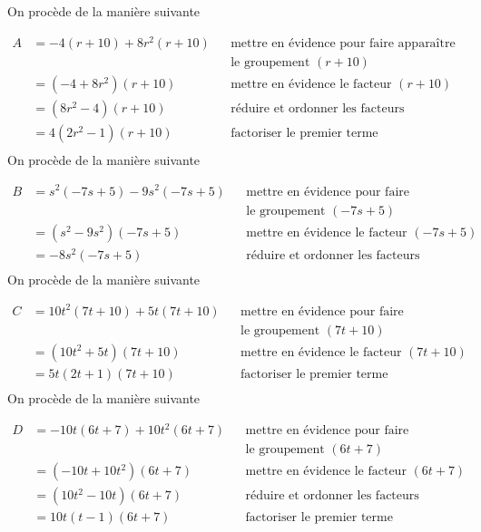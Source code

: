\documentclass[a4paper,12pt]{report}
\begin{document}
\begin{core}\phantom{ }

\begin{tasks}
\task On procède de la manière suivante 

\medskip
 $\begin{aligned}A&=-4 (r + 10 )+8 r^2(r + 10 )&&\text{mettre en évidence pour faire apparaître}\\
        & &&\text{le groupement }(r + 10 )\\&=(-4  + 8 r^2)(r + 10 )&& \text{mettre en évidence le facteur } (r + 10 )\\&=(8 r^2-4 )(r + 10 ) && \text{réduire et ordonner les facteurs}\\&={{4 (2 r^2-1)(r + 10 )}}&& \text{factoriser le premier terme}\\\end{aligned}$
\task On procède de la manière suivante 

\medskip
 $\begin{aligned}B&=s^2(-7 s + 5 )-9 s^2(-7 s + 5 )&&\text{mettre en évidence pour faire apparaître}\\
        & &&\text{le groupement }(-7 s + 5 )\\&=(s^2-9 s^2)(-7 s + 5 )&& \text{mettre en évidence le facteur } (-7 s + 5 )\\&={{-8 s^2(-7 s + 5 )}}&& \text{réduire et ordonner les facteurs}\\\end{aligned}$
\task On procède de la manière suivante 

\medskip
 $\begin{aligned}C&=10 t^2(7 t + 10 )+5 t(7 t + 10 )&&\text{mettre en évidence pour faire apparaître}\\
        & &&\text{le groupement }(7 t + 10 )\\&=(10 t^2 + 5 t)(7 t + 10 )&& \text{mettre en évidence le facteur } (7 t + 10 )\\&={{5 t(2 t + 1)(7 t + 10 )}}&& \text{factoriser le premier terme}\\\end{aligned}$
\task On procède de la manière suivante 

\medskip
 $\begin{aligned}D&=-10 t(6 t + 7 )+10 t^2(6 t + 7 )&&\text{mettre en évidence pour faire apparaître}\\
        & &&\text{le groupement }(6 t + 7 )\\&=(-10 t + 10 t^2)(6 t + 7 )&& \text{mettre en évidence le facteur } (6 t + 7 )\\&=(10 t^2-10 t)(6 t + 7 ) && \text{réduire et ordonner les facteurs}\\&={{10 t(t-1)(6 t + 7 )}}&& \text{factoriser le premier terme}\\\end{aligned}$
\end{tasks}

\end{core}
\end{document}
